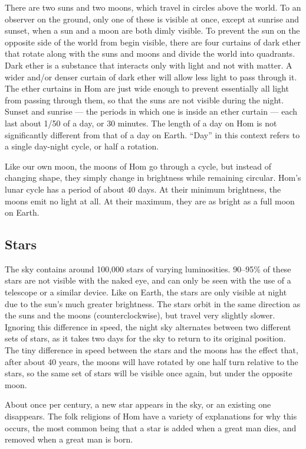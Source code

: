 \documentclass{article}
\begin{document}
There are two suns and two moons, which travel in circles above the world. To an observer on the ground, only one of these is visible at once, except at sunrise and sunset, when a sun and a moon are both dimly visible. To prevent the sun on the opposite side of the world from begin visible, there are four curtains of dark ether that rotate along with the suns and moons and divide the world into quadrants. Dark ether is a substance that interacts only with light and not with matter. A wider and/or denser curtain of dark ether will allow less light to pass through it. The ether curtains in Hom are just wide enough to prevent essentially all light from passing through them, so that the suns are not visible during the night. Sunset and sunrise --- the periods in which one is inside an ether curtain --- each last about 1/50 of a day, or 30 minutes. The length of a day on Hom is not significantly different from that of a day on Earth. ``Day'' in this context refers to a single day-night cycle, or half a rotation.


Like our own moon, the moons of Hom go through a cycle, but instead of changing shape, they simply change in brightness while remaining circular. Hom's lunar cycle has a period of about 40 days. At their minimum brightness, the moons emit no light at all. At their maximum, they are as bright as a full moon on Earth.

\subsection{Stars}

The sky contains around 100,000 stars of varying luminosities. 90--95\% of these stars are not visible with the naked eye, and can only be seen with the use of a telescope or a similar device. Like on Earth, the stars are only visible at night due to the sun's much greater brightness. The stars orbit in the same direction as the suns and the moons (counterclockwise), but travel very slightly slower. Ignoring this difference in speed, the night sky alternates between two different sets of stars, as it takes two days for the sky to return to its original position. The tiny difference in speed between the stars and the moons has the effect that, after about 40 years, the moons will have rotated by one half turn relative to the stars, so the same set of stars will be visible once again, but under the opposite moon.

About once per century, a new star appears in the sky, or an existing one disappears. The folk religions of Hom have a variety of explanations for why this occurs, the most common being that a star is added when a great man dies, and removed when a great man is born.
\end{document}

